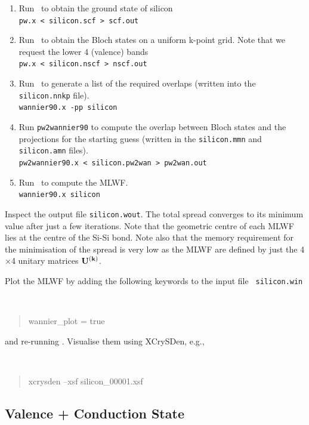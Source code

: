 \documentclass[a4paper,11pt,twoside]{article}
\begin{document}
\begin{enumerate}
\item Run \pwscf\ to obtain the ground state of silicon\\
{\tt pw.x < silicon.scf > scf.out}

\item Run \pwscf\ to obtain the Bloch states on a uniform k-point
  grid. Note that we request the lower 4 (valence) bands\\ 
{\tt pw.x < silicon.nscf > nscf.out}

\item Run \wannier\ to generate a list of the required overlaps (written
  into the {\tt silicon.nnkp} file).\\
{\tt wannier90.x -pp silicon}

\item Run {\tt pw2wannier90} to compute the overlap between Bloch
  states and the projections for the starting guess (written in the
  {\tt silicon.mmn} and {\tt  silicon.amn} files).\\
{\tt pw2wannier90.x < silicon.pw2wan > pw2wan.out}

\item Run \wannier\ to compute the MLWF.\\
{\tt wannier90.x silicon}

\end{enumerate}

Inspect the output file {\tt silicon.wout}. The total spread converges to its
minimum value after just a few iterations. Note that the geometric centre of
each MLWF lies at the centre of the Si-Si bond.
Note also that the memory requirement for the minimisation of
the spread is very low as the MLWF are defined 
by just the 4$\times$4 unitary matrices $\mathbf{U}^{(\mathbf{k})}$. 

Plot the MLWF by adding the following keywords to the input file {\tt
  silicon.win} 
{\tt
\begin{quote}
wannier\_plot = true
\end{quote} }
and re-running \wannier. Visualise them using XCrySDen, e.g.,
{\tt
\begin{quote}
xcrysden --xsf silicon\_00001.xsf
\end{quote} }

\subsection*{Valence + Conduction State}
\end{document}
